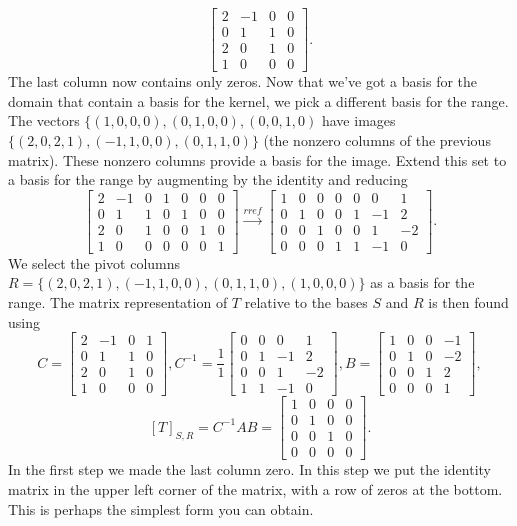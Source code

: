 \begin{example}
$$\begin{bmatrix}
 2 & -1 & 0 & 0 \\
 0 & 1 & 1 & 0 \\
 2 & 0 & 1 & 0 \\
 1 & 0 & 0 & 0
\end{bmatrix}.$$ 
The last column now contains only zeros. Now that we've got a basis for the domain that contain a basis for the kernel, we pick a different basis for the range.
The vectors $\{(1,0,0,0),(0,1,0,0),(0,0,1,0)$ have images $\{(2,0,2,1),(-1,1,0,0),(0,1,1,0)\}$ (the nonzero columns of the previous matrix). These nonzero columns provide a basis for the image.  Extend this set to a basis for the range by augmenting by the identity and reducing
$$\begin{bmatrix}
 2 & -1 & 0 & 1 & 0 & 0 & 0 \\
 0 & 1 & 1 & 0 & 1 & 0 & 0 \\
 2 & 0 & 1 & 0 & 0 & 1 & 0 \\
 1 & 0 & 0 & 0 & 0 & 0 & 1
\end{bmatrix}
\xrightarrow{rref}
\begin{bmatrix}
 1 & 0 & 0 & 0 & 0 & 0 & 1 \\
 0 & 1 & 0 & 0 & 1 & -1 & 2 \\
 0 & 0 & 1 & 0 & 0 & 1 & -2 \\
 0 & 0 & 0 & 1 & 1 & -1 & 0
\end{bmatrix}.
$$ 
We select the pivot columns $R = \{(2,0,2,1),(-1,1,0,0),(0,1,1,0),(1,0,0,0)\}$ as a basis for the range. 
The matrix representation of $T$ relative to the bases $S$ and $R$ is then found using 
$$C=
\begin{bmatrix}
 2 & -1 & 0 & 1 \\
 0 & 1 & 1 & 0 \\
 2 & 0 & 1 & 0 \\
 1 & 0 & 0 & 0
\end{bmatrix},
C^{-1} = \frac{1}{1}
\begin{bmatrix}
 0 & 0 & 0 & 1 \\
 0 & 1 & -1 & 2 \\
 0 & 0 & 1 & -2 \\
 1 & 1 & -1 & 0
\end{bmatrix},
B=
\begin{bmatrix}
 1 & 0 & 0 & -1 \\
 0 & 1 & 0 & -2 \\
 0 & 0 & 1 & 2 \\
 0 & 0 & 0 & 1
\end{bmatrix},$$
$$[T]_{S,R} = C^{-1}AB= 
\begin{bmatrix}
 1 & 0 & 0 & 0 \\
 0 & 1 & 0 & 0 \\
 0 & 0 & 1 & 0 \\
 0 & 0 & 0 & 0
\end{bmatrix}.$$ In the first step we made the last column zero. In this step we put the identity matrix in the upper left corner of the matrix, with a row of zeros at the bottom. 
This is perhaps the simplest form you can obtain.
\end{example}

